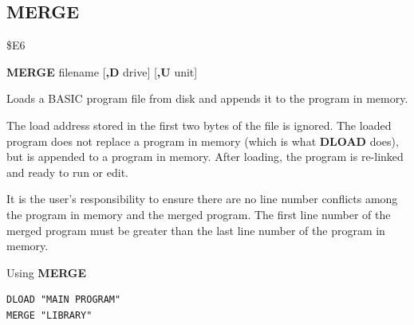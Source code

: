 \subsection{MERGE}
\begin{description}[leftmargin=2cm,style=nextline]
\item [Token:]    \$E6

\item [Format:]   {\bf MERGE} filename [{\bf,D} drive] [{\bf,U} unit]

\item [Usage:]    Loads a BASIC program file from disk and appends it to the program in memory.

                  \filenamedefinition

                  \drivedefinition

                  \unitdefinition

\item [Remarks:]  The load address stored in the first two bytes of the file is ignored. The loaded program does not replace a program in memory (which is what {\bf DLOAD} does), but is appended to a program in memory. After loading, the program is re-linked and ready to run or edit.

                  It is the user's responsibility to ensure there are no line number conflicts among the program in memory and the merged program. The first line number of the merged program must be greater than the last line number of the program in memory.

\item [Example:]  Using {\bf MERGE}

\begin{tcolorbox}[colback=black,coltext=white]
\verbatimfont{\codefont}
\begin{verbatim}
DLOAD "MAIN PROGRAM"
MERGE "LIBRARY"
\end{verbatim}
\end{tcolorbox}
\end{description}


\newpage
